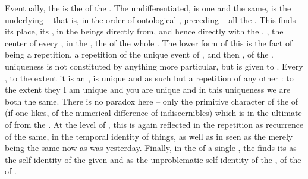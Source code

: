 \pa Eventually, the  is the  of the .  The
undifferentiated,  is one and the same, is the 
underlying -- that is, in the order of ontological , preceding --
all the .  This  finds its  place, its
, in the beings  directly from, and hence
 directly with the .  , the  center
of every ,  in the ,  the
 of the whole . The lower form of this  is the
fact of  being a repetition, a repetition of the unique event of
, and then , of the . 
uniqueness is not constituted by anything more particular, 
but is given to . Every ,
to the extent it is an , is unique and as such but a repetition of
any other : to the extent they   I am unique and you are unique and in this uniqueness
we are both the same.  There is no paradox here -- only the primitive character
of the  of  (if one likes, of the numerical difference of
indiscernibles) which is  in the ultimate  of
 from the .  At the level of , this is again
reflected in the repetition as recurrence of the same, in the temporal identity
of  things, as well as in  seen as the merely 
being the same now as  was yesterday.  Finally, in the  of a
single , the  finds its  as the self-identity
of the  given  and as the unproblematic self-identity
of the , of the  of .


